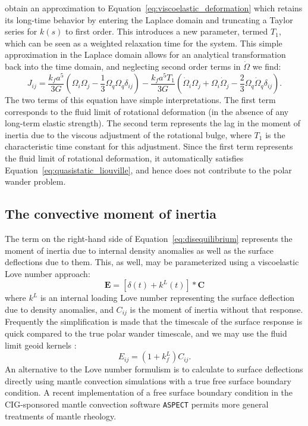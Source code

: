 \documentclass[extra,mreferee]{gji}
\begin{document}
\citet{ricard1993polar} obtain an approximation to Equation~\eqref{eq:viscoelastic_deformation} which retains its long-time behavior by entering the Laplace domain and truncating a Taylor series for $k(s)$ to first order.  
This introduces a new parameter, termed $T_1$, which can be seen as a weighted relaxation time for the system.  
This simple approximation in the Laplace domain allows for an analytical transformation back into the time domain, and neglecting second order terms in $\dot{\Omega}$ we find:
\begin{equation}
J_{ij} = \frac{k_f a^5}{3 G} \left( \Omega_i \Omega_j - \frac{1}{3} \Omega_q \Omega_q \delta_{ij} \right) -
 \frac{k_f a^5 T_1}{3G} \left(\dot{\Omega}_i \Omega_j + \Omega_i \dot{\Omega}_j - \frac{2}{3} \Omega_q \dot{\Omega}_q \delta_{ij} \right).
\label{eq:rotational_deformation}
\end{equation}
The two terms of this equation have simple interpretations.  
The first term corresponds to the fluid limit of rotational deformation (in the absence of any long-term elastic strength).  
The second term represents the lag in the moment of inertia due to the viscous adjustment of the rotational bulge, where $T_1$ is the characteristic time constant for this adjustment.
Since the first term represents the fluid limit of rotational deformation, it automatically satisfies Equation~\eqref{eq:quasistatic_liouville}, and hence does not contribute to the polar wander problem.

\subsection{The convective moment of inertia}
\label{sec:convective_moment}

The term on the right-hand side of Equation~\eqref{eq:disequilibrium} represents the moment of inertia due to internal density anomalies as well as the surface deflections due to them.
This, as well, may be parameterized using a viscoelastic Love number approach:
\begin{equation} 
\mathbf{E} = \left[ \delta(t) + k^L(t) \right] * \mathbf{C}
\end{equation}
where $k^L$ is an internal loading Love number representing the surface deflection due to density anomalies, and $C_{ij}$ is the moment of inertia without that response.
Frequently the simplification is made that the timescale of the surface response is quick compared to the true polar wander timescale, and we may use the fluid limit geoid kernels \citep[e.g.][]{richards1984geoid}:  
\begin{equation}
E_{ij} = (1+k^L_f) C_{ij}.
\end{equation}
An alternative to the Love number formulism is to calculate to surface deflections directly using mantle convection simulations with a true free surface boundary condition.
A recent implementation of a free surface boundary condition in the CIG-sponsored mantle convection software \texttt{ASPECT} \citep{rose2016free}
permits more general treatments of mantle rheology.
\end{document}
